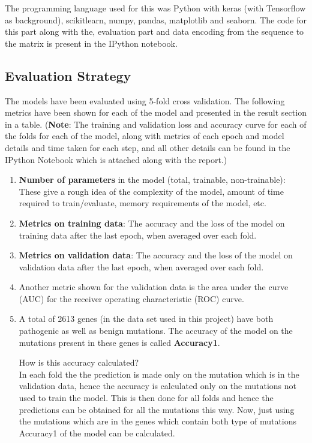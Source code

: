 \documentclass[twoside]{article}
\begin{document}
	The programming language used for this was Python with keras (with Tensorflow as background), scikitlearn, numpy, pandas, matplotlib and seaborn. The code for this part along with the, evaluation part and data encoding from the sequence to the matrix is present in the IPython notebook.
	
	\pagebreak
	
	\subsection{Evaluation Strategy}
	The models have been evaluated using 5-fold cross validation. The following metrics have been shown for each of the model and presented in the result section in a table. (\textbf{Note}: The training and validation loss and accuracy curve for each of the folds for each of the model, along with metrics of each epoch and model details and time taken for each step, and all other details can be found in the IPython Notebook which is attached along with the report.)
	\begin{enumerate}
		\item \textbf{Number of parameters} in the model (total, trainable, non-trainable): These give a rough idea of the complexity of the model, amount of time required to train/evaluate, memory requirements of the model, etc.
		\item \textbf{Metrics on training data}: The accuracy and the loss of the model on training data after the last epoch, when averaged over each fold.
		\item \textbf{Metrics on validation data}: The accuracy and the loss of the model on validation data after the last epoch, when averaged over each fold.
		\item Another metric shown for the validation data is the area under the curve (AUC) for the receiver operating characteristic (ROC) curve.
		\item A total of 2613 genes (in the data set used in this project) have both pathogenic as well as benign mutations. The accuracy of the model on the mutations present in these genes is called \textbf{Accuracy1}.
		
		How is this accuracy calculated?\\
		In each fold the the prediction is made only on the mutation which is in the validation data, hence the accuracy is calculated only on the mutations not used to train the model. This is then done for all folds and hence the predictions can be obtained for all the mutations this way. Now, just using the mutations which are in the genes which contain both type of mutations Accuracy1 of the model can be calculated.
	\end{enumerate}
\end{document}
